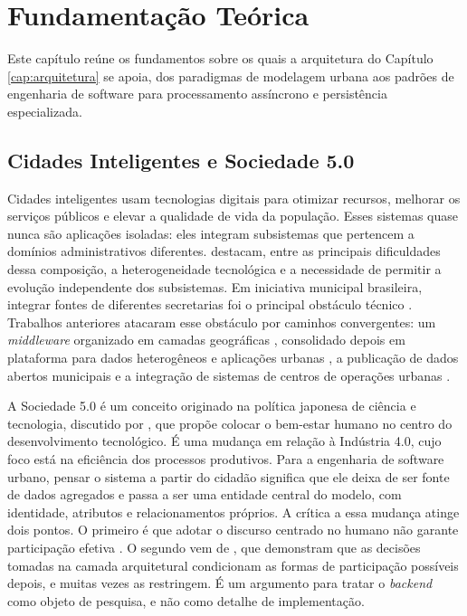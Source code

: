 \chapter{Fundamentação Teórica}
\label{cap:fundamentacao}

Este capítulo reúne os fundamentos sobre os quais a arquitetura do Capítulo \ref{cap:arquitetura} se apoia, dos paradigmas de modelagem urbana aos padrões de engenharia de software para processamento assíncrono e persistência especializada.

\section{Cidades Inteligentes e Sociedade 5.0}
\label{sec:cidades-inteligentes}

Cidades inteligentes usam tecnologias digitais para otimizar recursos, melhorar os serviços públicos e elevar a qualidade de vida da população. Esses sistemas quase nunca são aplicações isoladas: eles integram subsistemas que pertencem a domínios administrativos diferentes.  destacam, entre as principais dificuldades dessa composição, a heterogeneidade tecnológica e a necessidade de permitir a evolução independente dos subsistemas. Em iniciativa municipal brasileira, integrar fontes de diferentes secretarias foi o principal obstáculo técnico \cite{cacho2016smart}. Trabalhos anteriores atacaram esse obstáculo por caminhos convergentes: um \textit{middleware} organizado em camadas geográficas \cite{souza2018geographic}, consolidado depois em plataforma para dados heterogêneos e aplicações urbanas \cite{pereira2022platform}, a publicação de dados abertos municipais \cite{macedo2017comparative} e a integração de sistemas de centros de operações urbanas \cite{loss2024integrating}.

A Sociedade 5.0 é um conceito originado na política japonesa de ciência e tecnologia, discutido por , que propõe colocar o bem-estar humano no centro do desenvolvimento tecnológico. É uma mudança em relação à Indústria 4.0, cujo foco está na eficiência dos processos produtivos. Para a engenharia de software urbano, pensar o sistema a partir do cidadão significa que ele deixa de ser fonte de dados agregados e passa a ser uma entidade central do modelo, com identidade, atributos e relacionamentos próprios. A crítica a essa mudança atinge dois pontos. O primeiro é que adotar o discurso centrado no humano não garante participação efetiva \cite{taylor2023human,tappert2024citizen}. O segundo vem de , que demonstram que as decisões tomadas na camada arquitetural condicionam as formas de participação possíveis depois, e muitas vezes as restringem. É um argumento para tratar o \textit{backend} como objeto de pesquisa, e não como detalhe de implementação.

